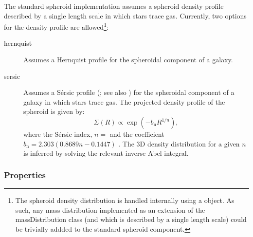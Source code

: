 The standard spheroid implementation assumes a spheroid density profile described by a single length scale in which stars trace gas. Currently, two options for the density profile are allowed\footnote{The spheroid density distribution is handled internally using a  object. As such, any mass distribution implemented as an extension of the {\normalfont \ttfamily massDistribution} class (and which is described by a single length scale) could be trivially addded to the standard spheroid component.}:
\begin{description}
\item [{\normalfont \ttfamily hernquist}] Assumes a Hernquist profile \citep{hernquist_analytical_1990} for the spheroidal \gls{component} of a galaxy.
\item [{\normalfont \ttfamily sersic}] Assumes a S\'ersic profile (\citealt{sersic_influence_1963}; see also \citealt{mazure_exact_2002}) for the spheroidal \gls{component} of a galaxy in which stars trace gas. The projected density profile of the spheroid is given by:
\begin{equation}
 \Sigma(R) \propto \exp\left(-b_\mathrm{n} R^{1/n} \right),
\end{equation}
where the S\'ersic index, $n=${\normalfont \ttfamily [spheroidSersicIndex]} and the coefficient $b_\mathrm{n}=2.303(0.8689 n-0.1447)$ \cite{wadadekar_two-dimensional_1999}. The 3D density distribution for a given $n$ is inferred by solving the relevant inverse Abel integral.
\end{description}

\subsubsection{Properties}

